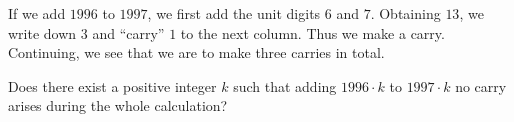 If we add $1996$ to $1997$,  we first add the unit digits $6$ and $7$. Obtaining $13$,  we write down $3$ and “carry” $1$ to the next column. Thus we make a carry. Continuing, we see that we are to make three carries in total.

Does there exist a positive integer $k$ such that adding $1996\cdot k$ to $1997\cdot k$ no carry arises during the whole calculation?